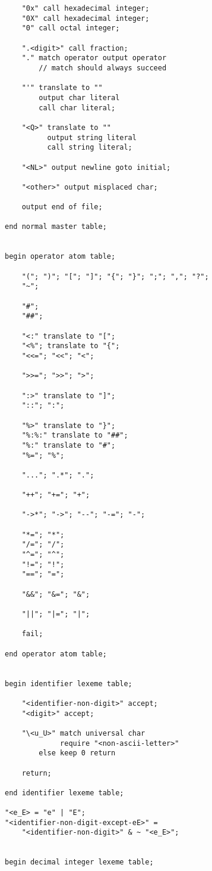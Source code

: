 \documentclass[12pt]{article}
\newenvironment{indpar}[1][0.3in]%
	{\begin{list}{}%
		     {\setlength{\itemsep}{0in}%
		      \setlength{\topsep}{0in}%
		      \setlength{\parsep}{1ex}%
		      \setlength{\labelwidth}{#1}%
		      \setlength{\leftmargin}{#1}%
		      \addtolength{\leftmargin}{\labelsep}}%
	 \item}%
	{\end{list}}
\begin{document}
\begin{indpar}
\begin{verbatim}
    "0x" call hexadecimal integer;
    "0X" call hexadecimal integer;
    "0" call octal integer;

    ".<digit>" call fraction;
    "." match operator output operator
        // match should always succeed

    "'" translate to ""
        output char literal
        call char literal;

    "<Q>" translate to ""
          output string literal
          call string literal;

    "<NL>" output newline goto initial;

    "<other>" output misplaced char;

    output end of file;

end normal master table;


begin operator atom table;

    "("; ")"; "["; "]"; "{"; "}"; ";"; ","; "?";
    "~";

    "#";
    "##";

    "<:" translate to "[";
    "<%"; translate to "{";
    "<<="; "<<"; "<";

    ">>="; ">>"; ">";

    ":>" translate to "]";
    "::"; ":";

    "%>" translate to "}";
    "%:%:" translate to "##";
    "%:" translate to "#";
    "%="; "%";

    "..."; ".*"; ".";

    "++"; "+="; "+";

    "->*"; "->"; "--"; "-="; "-";

    "*="; "*";
    "/="; "/";
    "^="; "^";
    "!="; "!";
    "=="; "=";

    "&&"; "&="; "&";

    "||"; "|="; "|";

    fail;

end operator atom table;


begin identifier lexeme table;

    "<identifier-non-digit>" accept;
    "<digit>" accept;

    "\<u_U>" match universal char
             require "<non-ascii-letter>"
        else keep 0 return

    return;

end identifier lexeme table;

"<e_E> = "e" | "E";
"<identifier-non-digit-except-eE>" =
    "<identifier-non-digit>" & ~ "<e_E>";


begin decimal integer lexeme table;


\end{verbatim}
\end{indpar}
\end{document}
